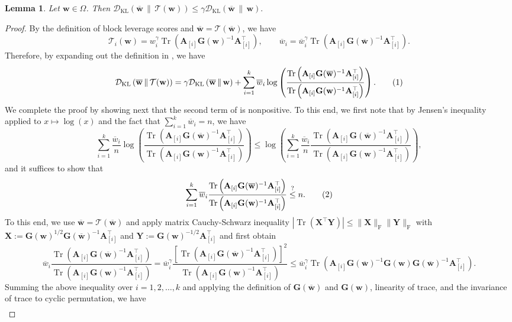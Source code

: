\documentclass[10pt,a4paper]{amsart}
\newtheorem{lemma}{Lemma}
\newcommand{\Tr}{\operatorname{Tr}}
\newcommand{\bAblk}[1]{\mathbf{A}_{[#1]}}
\newcommand{\bG}{\mathbf{G}}
\newcommand{\bX}{\mathbf{X}}
\newcommand{\bY}{\mathbf{Y}}
\newcommand{\bw}{\mathbf{w}}
\newcommand{\bwbar}{\overline{\mathbf{w}}}
\newcommand{\calT}{\mathcal{T}}
\newcommand{\kldiv}[2]{\mathcal{D}_{\mathrm{KL}}\left(#1 \,\|\, #2\right)}
\newcommand\numberthis{\addtocounter{equation}{1}\tag{\theequation}}
\newcommand{\omrp}{\gamma}
\newcommand{\wbar}{\overline{w}}
\begin{document}
\begin{lemma}
\label{lem:kl-contraction}
Let  $\bw\in\Omega$. Then  $\kldiv{\bwbar}{\calT(\bw)}
    \leq
    \omrp\kldiv{\bwbar}{\bw}.$
\end{lemma}

\begin{proof}
By  the definition of block leverage scores and $\bwbar=\calT(\bwbar)$, we have \[ \calT_i(\bw)=w_i^\omrp \Tr\left(\bAblk{i}\bG(\bw)^{-1}\bAblk{i}^\top\right), \qquad \wbar_i = \wbar_i^{\omrp} \Tr\left(\bAblk{i}\bG(\bwbar)^{-1}\bAblk{i}^\top\right).\] Therefore, by expanding out the definition in , we have \[\kldiv{\bwbar}{\calT(\bw)} = \omrp \kldiv{\bwbar}{\bw} + \sum_{i = 1}^k \wbar_i \log\left(\frac{\Tr\left(\bAblk{i}\bG(\bwbar)^{-1}\bAblk{i}^\top\right)}{\Tr\left(\bAblk{i}\bG(\bw)^{-1}\bAblk{i}^\top\right)}\right). \numberthis\label{eq:KLcon-2}\] We  complete the  proof  by showing next that the second term of  is nonpositive. To this end, we first note that by Jensen's inequality applied to $x\mapsto\log(x)$ and the fact that $\sum_{i=1}^k \wbar_i = n$, we have  \[ \sum_{i = 1}^k \frac{\wbar_i}{n} \log\left(\frac{\Tr\left(\bAblk{i}\bG(\bwbar)^{-1}\bAblk{i}^\top\right)}{\Tr\left(\bAblk{i}\bG(\bw)^{-1}\bAblk{i}^\top\right)}\right) \leq \log\left( \sum_{i=1}^k \frac{\wbar_i}{n} \frac{\Tr\left(\bAblk{i}\bG(\bwbar)^{-1}\bAblk{i}^\top\right)}{\Tr\left(\bAblk{i}\bG(\bw)^{-1}\bAblk{i}^\top\right)} \right),\] and it  suffices to show that \[\sum_{i=1}^k {\wbar_i} \frac{\Tr\left(\bAblk{i}\bG(\bwbar)^{-1}\bAblk{i}^\top\right)}{\Tr\left(\bAblk{i}\bG(\bw)^{-1}\bAblk{i}^\top\right)} \stackrel{?}{\leq} n.\numberthis\label{eq:KLcon-3}\]To this end, we use $\bwbar=\calT(\bwbar)$ and apply matrix Cauchy-Schwarz inequality $\left|\Tr\left(\bX^\top\bY\right)\right|\leq \|\bX\|_{\mathrm{F}}\|\bY\|_{\mathrm{F}}$ with $\bX:=\bG(\bw)^{1/2}\bG(\bwbar)^{-1}\bAblk{i}^\top$ and $\bY:= \bG(\bw)^{-1/2}\bAblk{i}^\top$ and first obtain \[\wbar_i \frac{\Tr\left(\bAblk{i} \bG(\bwbar)^{-1}\bAblk{i}^\top\right)}{\Tr\left(\bAblk{i} \bG(\bw)^{-1}\bAblk{i}^\top\right)} = \wbar_i^{\omrp} \frac{\left[\Tr \left(\bAblk{i}\bG(\bwbar)^{-1}\bAblk{i}^\top\right)\right]^2}{\Tr\left(\bAblk{i}\bG(\bw)^{-1}\bAblk{i}^\top\right)} \leq \wbar_i^{\omrp} \Tr\left(\bAblk{i} \bG(\bwbar)^{-1}\bG(\bw)  \bG(\bwbar)^{-1} \bAblk{i}^\top\right).\] Summing the above inequality over $i = 1, 2, \dotsc, k$ and applying the definition of $\bG(\bwbar)$ and $\bG(\bw)$, linearity of trace, and the invariance of trace to cyclic permutation, we have
\begin{align*}

\end{align*}
\end{proof}
\end{document}
